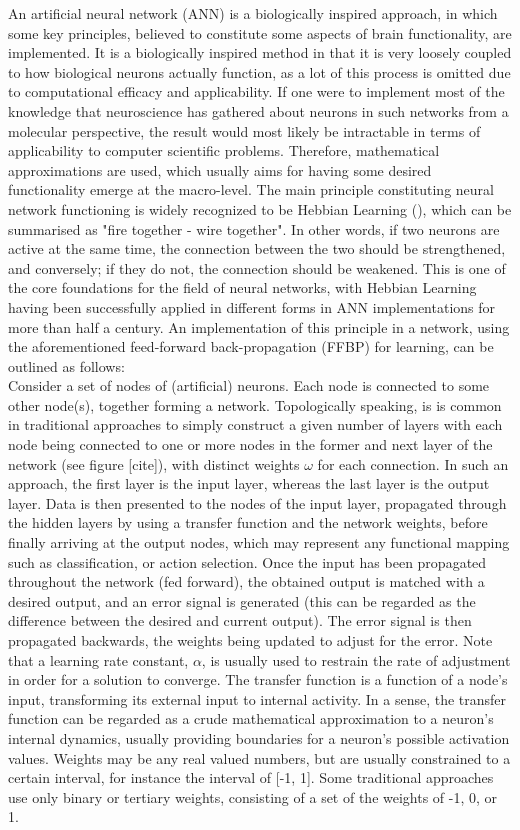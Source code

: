 An artificial neural network (ANN) is a biologically inspired approach, in which some key principles, believed to constitute some aspects of brain functionality, are implemented. It is a biologically inspired method in that it is very loosely coupled to how biological neurons actually function, as a lot of this process is omitted due to computational efficacy and applicability. If one were to implement most of the knowledge that neuroscience has gathered about neurons in such networks from a molecular perspective, the result would most likely be intractable in terms of applicability to computer scientific problems. Therefore, mathematical approximations are used, which usually aims for having some desired functionality emerge at the macro-level. The main principle constituting neural network functioning is widely recognized to be Hebbian Learning (\cite{Hebb1949}), which can be summarised as "fire together - wire together". In other words, if two neurons are active at the same time, the connection between the two should be strengthened, and conversely; if they do not, the connection should be weakened. This is one of the core foundations for the field of neural networks, with Hebbian Learning having been successfully applied in different forms in ANN implementations for more than half a century. An implementation of this principle in a network, using the aforementioned feed-forward back-propagation (FFBP) for learning, can be outlined as follows:
\\
Consider a set of nodes of (artificial) neurons. Each node is connected to some other node(s), together forming a network. Topologically speaking, is is common in traditional approaches to simply construct a given number of layers with each node being connected to one or more nodes in the former and next layer of the network (see figure [cite]), with distinct weights $\omega$ for each connection. In such an approach, the first layer is the input layer, whereas the last layer is the output layer. Data is then presented to the nodes of the input layer, propagated through the hidden layers by using a transfer function and the network weights, before finally arriving at the output nodes, which may represent any functional mapping such as classification, or action selection. Once the input has been propagated throughout the network (fed forward), the obtained output is matched with a desired output, and an error signal is generated (this can be regarded as the difference between the desired and current output). The error signal is then propagated backwards, the weights being updated to adjust for the error. Note that a learning rate constant, $\alpha$, is usually used to restrain the rate of adjustment in order for a solution to converge.
The transfer function is a function of a node's input, transforming its external input to internal activity. In a sense, the transfer function can be regarded as a crude mathematical approximation to a neuron's internal dynamics, usually providing boundaries for a neuron's possible activation values. Weights may be any real valued numbers, but are usually constrained to a certain interval, for instance the interval of [-1, 1]. Some traditional approaches use only binary or tertiary weights, consisting of a set of the weights of -1, 0, or 1.

